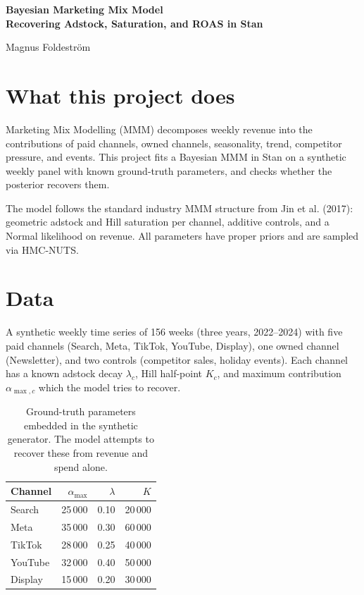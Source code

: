 \documentclass[a4paper,11pt]{article}
\begin{document}
\begin{titlepage}
\thispagestyle{empty}
\centering
\vspace*{3cm}
{\Huge\bfseries Bayesian Marketing Mix Model\\\bigskip
\LARGE Recovering Adstock, Saturation, and ROAS in Stan
\par}
\vspace{1.5cm}
{\Large Magnus Foldeström\par}
\vfill
\end{titlepage}

\section{What this project does}

Marketing Mix Modelling (MMM) decomposes weekly revenue into the
contributions of paid channels, owned channels, seasonality, trend,
competitor pressure, and events. This project fits a Bayesian MMM in
Stan on a synthetic weekly panel with known ground-truth parameters,
and checks whether the posterior recovers them.

The model follows the standard industry MMM structure from Jin et al. (2017): geometric
adstock and Hill saturation per channel, additive controls, and a
Normal likelihood on revenue. All parameters have proper priors and
are sampled via HMC-NUTS.

\section{Data}

A synthetic weekly time series of 156 weeks (three years, 2022--2024)
with five paid channels (Search, Meta, TikTok, YouTube, Display), one
owned channel (Newsletter), and two controls (competitor sales,
holiday events). Each channel has a known adstock decay $\lambda_c$,
Hill half-point $K_c$, and maximum contribution $\alpha_{\max,c}$
which the model tries to recover.

\begin{table}[H]
\centering
\begin{tabular}{l r r r}
\toprule
\textbf{Channel} & $\alpha_{\max}$ & $\lambda$ & $K$ \\
\midrule
Search  & 25\,000 & 0.10 & 20\,000 \\
Meta    & 35\,000 & 0.30 & 60\,000 \\
TikTok  & 28\,000 & 0.25 & 40\,000 \\
YouTube & 32\,000 & 0.40 & 50\,000 \\
Display & 15\,000 & 0.20 & 30\,000 \\
\bottomrule
\end{tabular}
\caption{Ground-truth parameters embedded in the synthetic generator. The model attempts to recover these from revenue and spend alone.}
\end{table}
\end{document}
